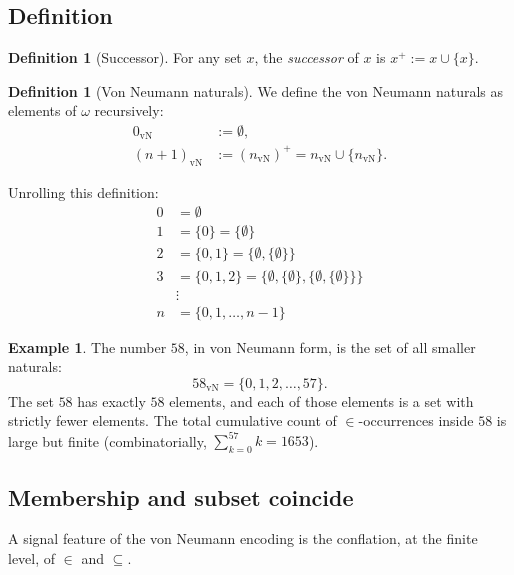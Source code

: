\documentclass[12pt]{article}
\theoremstyle{definition}
\newtheorem{definition}[theorem]{Definition}
\newtheorem{example}[theorem]{Example}
\theoremstyle{remark}
\begin{document}
\subsection{Definition}

\begin{definition}[Successor]\label{def:succ}
For any set $x$, the \emph{successor} of $x$ is
$x^+ := x \cup \{x\}$.
\end{definition}

\begin{definition}[Von Neumann naturals]\label{def:vN}
We define the von Neumann naturals as elements of $\omega$ recursively:
\begin{align}
0_{\mathrm{vN}} &:= \emptyset, \\
(n+1)_{\mathrm{vN}} &:= (n_{\mathrm{vN}})^+ = n_{\mathrm{vN}} \cup \{n_{\mathrm{vN}}\}.
\end{align}
\end{definition}

Unrolling this definition:
\begin{align*}
0 &= \emptyset \\
1 &= \{0\} = \{\emptyset\} \\
2 &= \{0, 1\} = \{\emptyset, \{\emptyset\}\} \\
3 &= \{0, 1, 2\} = \{\emptyset, \{\emptyset\}, \{\emptyset, \{\emptyset\}\}\} \\
&\vdots \\
n &= \{0, 1, \ldots, n-1\}
\end{align*}

\begin{example}\label{ex:58}
The number $58$, in von Neumann form, is the set of all smaller naturals:
\begin{equation}
58_{\mathrm{vN}} = \{0, 1, 2, \ldots, 57\}.
\end{equation}
The set $58$ has exactly $58$ elements, and each of those elements is a set
with strictly fewer elements. The total cumulative count of $\in$-occurrences
inside $58$ is large but finite (combinatorially, $\sum_{k=0}^{57} k = 1653$).
\end{example}

\subsection{Membership and subset coincide}

A signal feature of the von Neumann encoding is the conflation, at the
finite level, of $\in$ and $\subseteq$.
\end{document}
